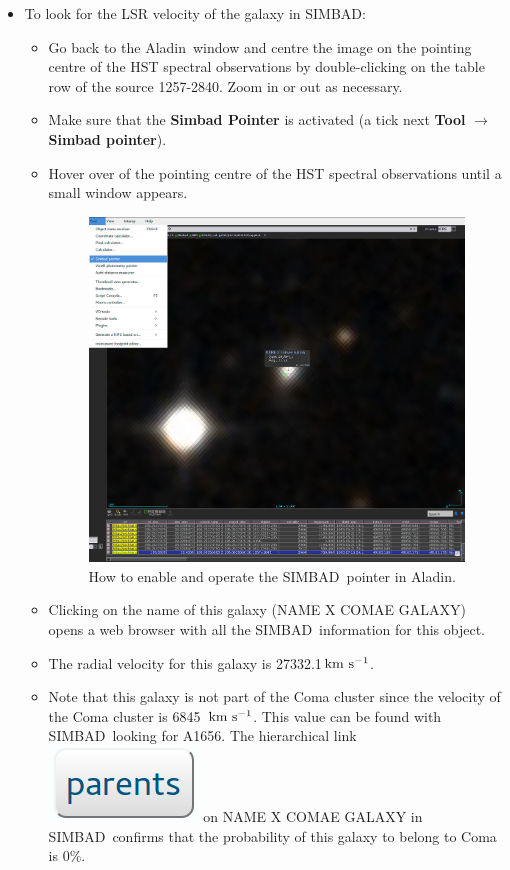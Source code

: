 \documentclass [a4paper, 12pt]{article}
\def\kms{\rm km\ s^{-1}}
\newcommand{\aladin}{{\textsc{A}{ladin}}}
\newcommand{\simbad}{{\textsc{SIMBAD}}}
\begin{document}
\begin{itemize}
\item To look for the LSR velocity of the galaxy in \simbad:
\begin{itemize}
\item Go back to the \aladin\ window and centre the image on the pointing 
centre of the HST spectral observations by double-clicking on the table row of 
the source 1257-2840. Zoom in or out as necessary. 
\item Make sure that the \textbf{Simbad Pointer} is activated (a tick next 
\textbf{Tool} $\rightarrow$ \textbf{Simbad pointer}). 
\item Hover over of the pointing centre of the HST spectral observations until 
a small window appears. 
\begin{figure}[H]
\center
\includegraphics[width=0.5  
\textwidth]{../images/aladin_simbad_pointer-coma.png}
\caption{How to enable and operate the \simbad\ pointer in \aladin.}
\label{fig:slit}
\end{figure}
\item Clicking on the name of this galaxy (NAME X COMAE GALAXY) opens a web 
browser with all the \simbad\ information for this object. 
\item The radial velocity for this galaxy is 27332.1\,$\kms$. 
\item Note that this galaxy is not part of the Coma cluster since the velocity 
of the Coma cluster is 6845~$\kms$. This value can be found with \simbad\ 
looking for A1656. The hierarchical link \includegraphics[width=0.07 
\textwidth]{../images/simbad_button_parents.png} on NAME X COMAE GALAXY in 
\simbad\ confirms that the probability of this galaxy to belong to Coma is 0\%.
\end{itemize}


\end{itemize}
\end{document}
